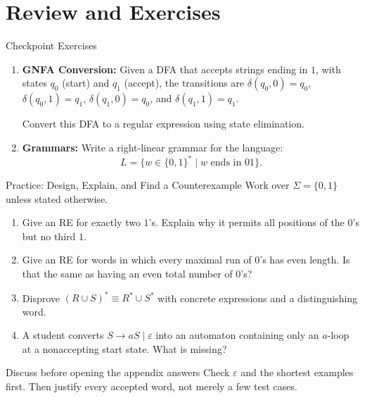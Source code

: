 \documentclass[10pt]{beamer}
\begin{document}
\section{Review and Exercises}

\begin{frame}{Checkpoint Exercises}
  \begin{enumerate}
    \item \textbf{GNFA Conversion:} Given a DFA that accepts strings ending in
      $1$, with states $q_0$ (start) and $q_1$ (accept), the transitions are
      $\delta(q_0,0)=q_0$, $\delta(q_0,1)=q_1$,
      $\delta(q_1,0)=q_0$, and $\delta(q_1,1)=q_1$.

      Convert this DFA to a regular expression using state elimination.

      \vspace{0.6cm}
    \item \textbf{Grammars:} Write a right-linear grammar for the language:
      \[ L = \{w \in \{0,1\}^* \mid w \text{ ends in } 01 \}. \]
  \end{enumerate}
\end{frame}

\begin{frame}{Practice: Design, Explain, and Find a Counterexample}
  \small
  Work over $\Sigma=\{0,1\}$ unless stated otherwise.
  \begin{enumerate}
    \item Give an RE for exactly two $1$'s. Explain why it permits all
      positions of the $0$'s but no third $1$.
    \item Give an RE for words in which every maximal run of $0$'s has even
      length. Is that the same as having an even total number of $0$'s?
    \item Disprove $(R\cup S)^*\equiv R^*\cup S^*$ with concrete
      expressions and a distinguishing word.
    \item A student converts $S\to aS\mid\varepsilon$ into an automaton
      containing only an $a$-loop at a nonaccepting start state. What is missing?
  \end{enumerate}
  \pause
  \begin{block}{Discuss before opening the appendix answers}
    Check $\varepsilon$ and the shortest examples first. Then justify every
    accepted word, not merely a few test cases.
  \end{block}
\end{frame}
\end{document}

